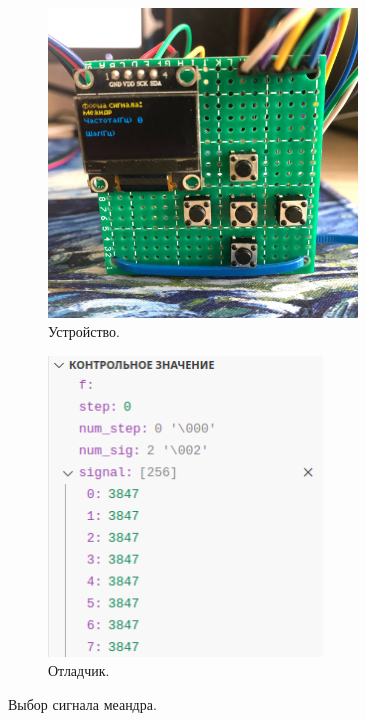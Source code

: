 	\begin{figure}[H]
     \begin{subfigure}[H]{0.5\textwidth}
         \centering
         \includegraphics[width=0.9\textwidth]{../image/test2_u_s.jpg}
         \caption{Устройство.}
     \end{subfigure}
     \hfill
     \begin{subfigure}[H]{0.5\textwidth}
         \centering
         \includegraphics[width=0.8\textwidth]{../image/test2_o_s.png}
         \caption{Отладчик.}
     \end{subfigure}
        \caption{Выбор сигнала меандра.}
	\end{figure}
	
